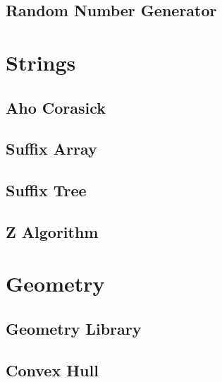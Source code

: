 \subsection{Random Number Generator}
\raggedbottom
\hrulefill

\section{Strings}
\subsection{Aho Corasick}
\raggedbottom
\hrulefill
\subsection{Suffix Array}
\raggedbottom
\hrulefill
\subsection{Suffix Tree}
\raggedbottom
\hrulefill
\subsection{Z Algorithm}
\raggedbottom
\hrulefill

\section{Geometry}
\subsection{Geometry Library}
\raggedbottom
\hrulefill
\subsection{Convex Hull}
\raggedbottom
\hrulefill

